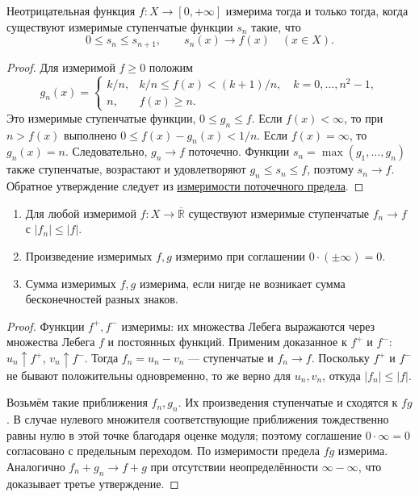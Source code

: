 \label{ticket:26}

\begin{theorem}
Неотрицательная функция $f:X\to[0,+\infty]$ измерима тогда и только тогда, когда существуют измеримые ступенчатые функции $s_n$ такие, что
\[
  0\le s_n\le s_{n+1},\qquad s_n(x)\longrightarrow f(x)\quad(x\in X).
\]
\end{theorem}

\begin{proof}
Для измеримой $f\ge0$ положим
\[
  g_n(x)=
  \begin{cases}
    k/n,& k/n\le f(x)<(k+1)/n,\quad k=0,\ldots,n^2-1,\\
    n,& f(x)\ge n.
  \end{cases}
\]
Это измеримые ступенчатые функции, $0\le g_n\le f$.
Если $f(x)<\infty$, то при $n>f(x)$ выполнено $0\le f(x)-g_n(x)<1/n$.
Если $f(x)=\infty$, то $g_n(x)=n$.
Следовательно, $g_n\to f$ поточечно.
Функции $s_n=\max(g_1,\ldots,g_n)$ также ступенчатые, возрастают и удовлетворяют $g_n\le s_n\le f$, поэтому $s_n\to f$.
Обратное утверждение следует из \hyperref[ticket:25]{измеримости поточечного предела}.
\end{proof}

\begin{theorem}[Следствия]
\begin{enumerate}
  \item Для любой измеримой $f:X\to\overline{\mathbb R}$ существуют измеримые ступенчатые $f_n\to f$ с $|f_n|\le|f|$.
  \item Произведение измеримых $f,g$ измеримо при соглашении $0\cdot(\pm\infty)=0$.
  \item Сумма измеримых $f,g$ измерима, если нигде не возникает сумма бесконечностей разных знаков.
\end{enumerate}
\end{theorem}

\begin{proof}
Функции $f^+,f^-$ измеримы: их множества Лебега выражаются через множества Лебега $f$ и постоянных функций.
Применим доказанное к $f^+$ и $f^-$: $u_n\uparrow f^+$, $v_n\uparrow f^-$.
Тогда $f_n=u_n-v_n$ --- ступенчатые и $f_n\to f$.
Поскольку $f^+$ и $f^-$ не бывают положительны одновременно, то же верно для $u_n,v_n$, откуда $|f_n|\le|f|$.

Возьмём такие приближения $f_n,g_n$.
Их произведения ступенчатые и сходятся к $fg$.
В случае нулевого множителя соответствующие приближения тождественно равны нулю в этой точке благодаря оценке модуля; поэтому соглашение $0\cdot\infty=0$ согласовано с предельным переходом.
По измеримости предела $fg$ измерима.
Аналогично $f_n+g_n\to f+g$ при отсутствии неопределённости $\infty-\infty$, что доказывает третье утверждение.
\end{proof}
